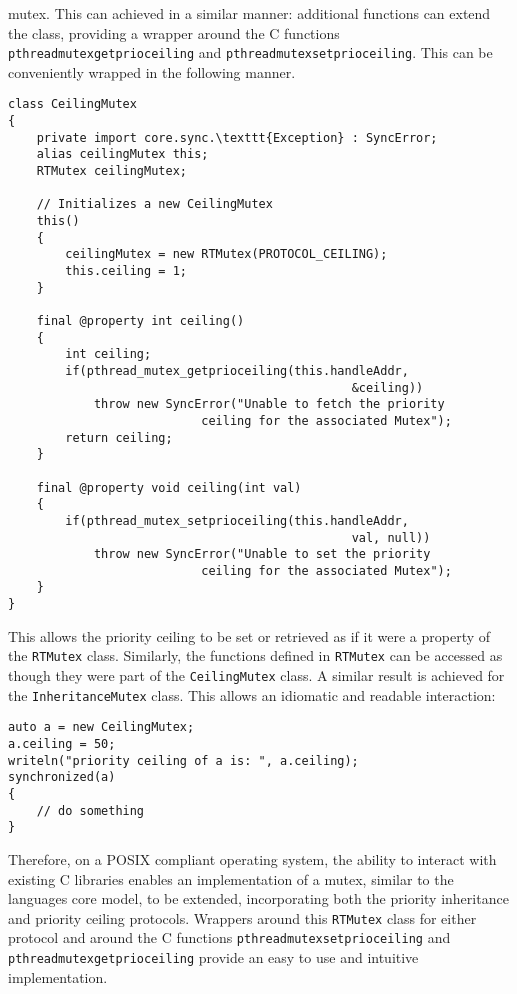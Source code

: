 mutex. This can achieved in a similar manner: additional 
functions can extend the class, providing a wrapper around the C functions 
\texttt{pthread\textunderscore{}mutex\textunderscore{}getprioceiling} and 
\texttt{pthread\textunderscore{}mutex\textunderscore{}setprioceiling}.
This can be conveniently wrapped in the following manner. 
\begin{lstlisting}
class CeilingMutex 
{
    private import core.sync.\texttt{Exception} : SyncError;
    alias ceilingMutex this;
    RTMutex ceilingMutex;

    // Initializes a new CeilingMutex
    this()
    {
        ceilingMutex = new RTMutex(PROTOCOL_CEILING);
        this.ceiling = 1;
    }

    final @property int ceiling()
    {
        int ceiling; 
        if(pthread_mutex_getprioceiling(this.handleAddr, 
                                                &ceiling))
            throw new SyncError("Unable to fetch the priority 
                           ceiling for the associated Mutex"); 
        return ceiling; 
    }

    final @property void ceiling(int val)
    {
        if(pthread_mutex_setprioceiling(this.handleAddr, 
                                                val, null))
            throw new SyncError("Unable to set the priority 
                           ceiling for the associated Mutex"); 
    }
}
\end{lstlisting}
This allows the priority ceiling to be set or retrieved as if it were a property of 
the \texttt{RTMutex} class. Similarly, the functions defined in \texttt{RTMutex} 
can be accessed as though they were part of the \texttt{CeilingMutex} class. 
A similar result is achieved for the \texttt{InheritanceMutex} class.
This allows an idiomatic and readable interaction: 
\begin{lstlisting}
auto a = new CeilingMutex;
a.ceiling = 50; 
writeln("priority ceiling of a is: ", a.ceiling); 
synchronized(a) 
{
    // do something
}
\end{lstlisting}
Therefore, on a POSIX compliant operating system, the ability to interact with 
existing C libraries enables an implementation of a mutex, similar to the languages 
core model, to be extended, incorporating both the priority inheritance and 
priority ceiling protocols. Wrappers around this \texttt{RTMutex} class for 
either protocol and around the C functions 
\texttt{pthread\textunderscore{}mutex\textunderscore{}setprioceiling} 
and \texttt{pthread\textunderscore{}mutex\textunderscore{}getprioceiling{}} 
provide an easy to use and intuitive implementation. 

